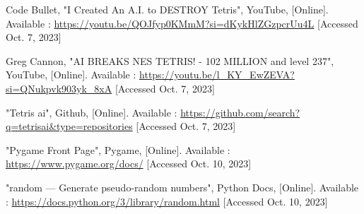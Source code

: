 \documentclass[conference]{IEEEtran}
\begin{document}
\begin{thebibliography}{00}
 Code Bullet, "I Created An A.I. to DESTROY Tetris", YouTube, [Online]. Available : \url{https://youtu.be/QOJfyp0KMmM?si=dKykHlZGzpcrUu4L} [Accessed Oct. 7, 2023]

 Greg Cannon, "AI BREAKS NES TETRIS! - 102 MILLION and level 237", YouTube, [Online]. Available : \url{https://youtu.be/l_KY_EwZEVA?si=QNukpvk903yk_8xA} [Accessed Oct. 7, 2023]

 "Tetris ai", Github, [Online]. Available : \url{https://github.com/search?q=tetrisai&type=repositories} [Accessed Oct. 7, 2023]

 "Pygame Front Page", Pygame, [Online]. Available : \url{https://www.pygame.org/docs/} [Accessed Oct. 10, 2023]

 "random — Generate pseudo-random numbers", Python Docs, [Online]. Available : \url{https://docs.python.org/3/library/random.html} [Accessed Oct. 10, 2023]



\end{thebibliography}
\end{document}
